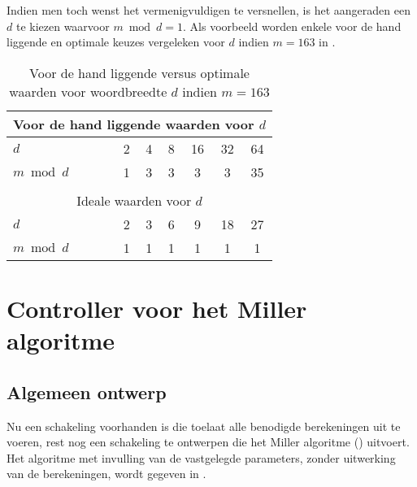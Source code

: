 Indien men toch wenst het vermenigvuldigen te versnellen, is het aangeraden een $d$ te kiezen waarvoor $m \bmod d = 1$. Als voorbeeld worden enkele voor de hand liggende en optimale keuzes vergeleken voor $d$ indien $m = 163$ in .

\begin{table}[h]
	\caption{Voor de hand liggende versus optimale waarden voor woordbreedte $d$ indien \mbox{$m=163$}}
	\label{tabel-implementatie-woordbreedte-d}

	\centering
	\begin{tabular}{lcccccc}
		\toprule
		\multicolumn{7}{c}{Voor de hand liggende waarden voor $d$}\\
		\midrule
		$d$			& 2	& 4	& 8	& 16	& 32	& 64\\
		$m \bmod d \qquad$	& 1	& 3	& 3	& 3	& 3	& 35\\
		\bottomrule
		\multicolumn{7}{c}{}\\
		\toprule
		\multicolumn{7}{c}{Ideale waarden voor $d$}\\
		\midrule
		$d$			& 2	& 3	& 6	& 9	& 18	& 27\\
		$m \bmod d$	& 1	& 1	& 1	& 1	& 1	& 1\\
		\bottomrule
	\end{tabular}
\end{table}

\section{Controller voor het Miller algoritme\label{sectie-implementatie-miller}}

\subsection{Algemeen ontwerp\label{subsectie-implementatie-miller-ontwerp}}

Nu een schakeling voorhanden is die toelaat alle benodigde berekeningen uit te voeren, rest nog een schakeling te ontwerpen die het Miller algoritme () uitvoert. Het algoritme met invulling van de vastgelegde parameters, zonder uitwerking van de berekeningen, wordt gegeven in .

